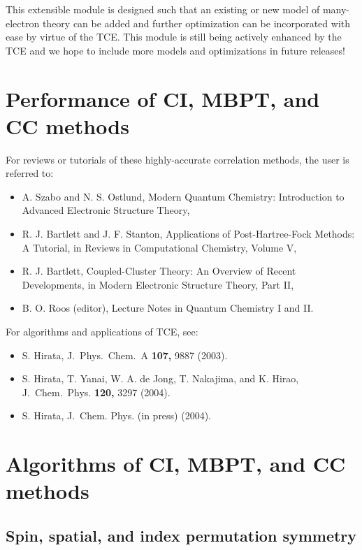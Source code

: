 This extensible module is designed such that an existing or new model of many-electron
theory can be added and further optimization can be incorporated with ease 
by virtue of the TCE.
This module is still being
actively enhanced by the TCE and we hope to include more models and optimizations
in future releases!

\section{Performance of CI, MBPT, and CC methods}

For reviews or tutorials of these highly-accurate correlation methods, the user is 
referred to:
\begin{itemize}
\item A. Szabo and N. S. Ostlund, Modern Quantum Chemistry: Introduction to Advanced Electronic Structure Theory,
\item R. J. Bartlett and J. F. Stanton, Applications of Post-Hartree-Fock Methods: A Tutorial, in Reviews in Computational Chemistry, Volume V,
\item R. J. Bartlett, Coupled-Cluster Theory: An Overview of Recent Developments, in Modern Electronic Structure Theory, Part II,
\item B. O. Roos (editor), Lecture Notes in Quantum Chemistry I and II.
\end{itemize}

For algorithms and applications of TCE, see:
\begin{itemize}
\item S. Hirata, J.\ Phys.\ Chem.\ A {\bf 107,} 9887 (2003).
\item S. Hirata, T. Yanai, W. A. de Jong, T. Nakajima, and K. Hirao, J.\ Chem.\ Phys. {\bf 120,} 3297 (2004).
\item S. Hirata, J.\ Chem. Phys. (in press) (2004).
\end{itemize}

\section{Algorithms of CI, MBPT, and CC methods}

\subsection{Spin, spatial, and index permutation symmetry}

